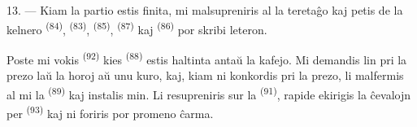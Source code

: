 13. --- Kiam la partio estis finita, mi malsupreniris al la teretaĝo kaj petis
de la kelnero  \textsuperscript{(84)}, 
\textsuperscript{(83)},  \textsuperscript{(85)},
 \textsuperscript{(87)} kaj 
\textsuperscript{(86)} por skribi leteron.

Poste mi vokis  \textsuperscript{(92)} kies
 \textsuperscript{(88)} estis haltinta antaŭ la kafejo. Mi
demandis lin pri la prezo laŭ la horoj aŭ unu kuro, kaj, kiam ni konkordis pri
la prezo, li malfermis al mi la  \textsuperscript{(89)}
kaj instalis min. Li resupreniris sur la 
\textsuperscript{(91)}, rapide ekirigis la ĉevalojn per 
\textsuperscript{(93)} kaj ni foriris por promeno ĉarma.
\VUsaut{6.0mm}
\VUfilet{22mm}
